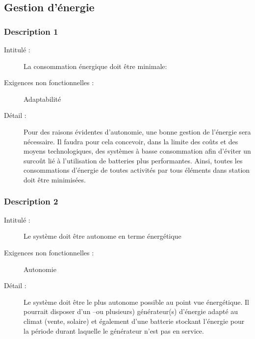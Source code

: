\documentclass[11pt]{article}
\begin{document}
\subsection {Gestion d'énergie}
\subsubsection {Description 1}
\begin{description}
           \item[Intitulé :] La consommation énergique doit être minimale:
           \item[Exigences non fonctionnelles :] Adaptabilité 
           \item[Détail :] Pour des raisons évidentes d'autonomie,  une bonne gestion de l'énergie sera nécessaire. Il faudra pour cela concevoir, dans la limite des coûts et des moyens technologiques, des systèmes à basse consommation afin d'éviter un surcoût lié à l'utilisation de batteries plus performantes. Ainsi, toutes les consommations d’énergie de toutes activités par tous éléments dans station doit être minimisées.  
\end{description}

\subsubsection {Description 2}
\begin{description}
           \item[Intitulé :] Le système doit être autonome en terme énergétique 
           \item[Exigences non fonctionnelles :] Autonomie
           \item[Détail :] Le système doit être le plus autonome possible au point vue énergétique. Il pourrait disposer d’un –ou plusieurs) générateur(s) d’énergie adapté au climat (vente, solaire) et également d’une batterie stockant l'énergie pour la période durant laquelle le générateur n'est pas en service. 
\end{description}
\end{document}
